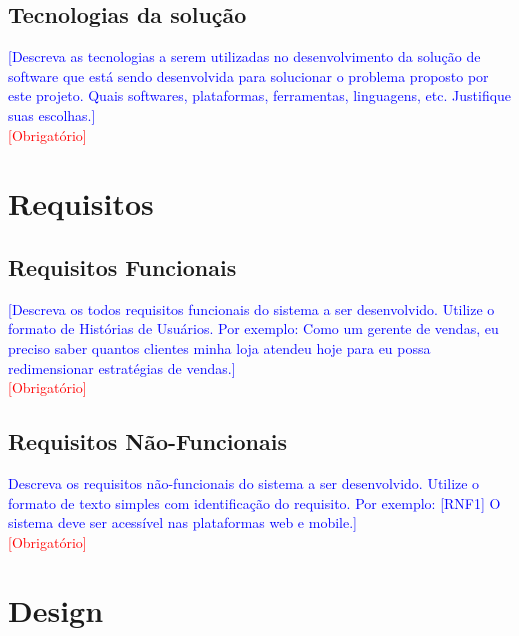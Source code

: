 \documentclass[10pt]{relatorio_tcc_ads_ifba}
\begin{document}
\subsection{Tecnologias da solução}
\textcolor{blue}{
    [Descreva as tecnologias a serem utilizadas no desenvolvimento da solução de software que está sendo desenvolvida para solucionar o problema proposto por este projeto. Quais softwares, plataformas, ferramentas, linguagens, etc. Justifique suas escolhas.]
} \\
\textcolor{red}{[Obrigatório]}

\section{Requisitos}

\subsection{Requisitos Funcionais}
\textcolor{blue}{
    [Descreva os todos requisitos funcionais do sistema a ser desenvolvido. Utilize o formato de Histórias de Usuários. Por exemplo: Como um gerente de vendas, eu preciso saber quantos clientes minha loja atendeu hoje para eu possa redimensionar estratégias de vendas.]
} \\
\textcolor{red}{[Obrigatório]}

\subsection{Requisitos Não-Funcionais}
\textcolor{blue}{
    Descreva os requisitos não-funcionais do sistema a ser desenvolvido. Utilize o formato de texto simples com identificação do requisito. Por exemplo: [RNF1] O sistema deve ser acessível nas plataformas web e mobile.]
} \\
\textcolor{red}{[Obrigatório]}

\section{Design}
\end{document}
